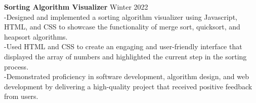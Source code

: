 \documentclass[10pt]{book}
\begin{document}
{        %
        {
            \noindent\fontsize{11}{11}
            \selectfont\hspace{-3pt}\textbf{Sorting Algorithm Visualizer \textendash}\hfill Winter 2022
        }
        \\
        \hspace{2pt}-\hspace{6pt}Designed and implemented a sorting algorithm visualizer using Javascript, HTML, and CSS to showcase the functionality of merge sort, quicksort, and 
                                heapsort algorithms.
        \\
        \hspace{2pt}-\hspace{6pt}Used HTML and CSS to create an engaging and user-friendly interface that displayed the array of numbers and highlighted the current step in the sorting process.
        \\
        \hspace{2pt}-\hspace{6pt}Demonstrated proficiency in software development, algorithm design, and web development by delivering a high-quality project that received positive 
                                feedback from users.
        \iffalse
        \\
        {
            \noindent\fontsize{11}{11}
            \selectfont\hspace{-3pt}\textbf{Text Editor \textendash}\hfill Fall 2022
        }
        \\
        \hspace{2pt}-\hspace{6pt}Collaborated with partner in developing a What You See is What You Get text editor
        \\
        \hspace{2pt}-\hspace{6pt}Used object-oriented design patterns such as the composite design pattern to better calculate positions of glyphs entered by user
        \\
        \hspace{2pt}-\hspace{6pt}Featured spell checker, image/shape insertion and undo/redo functionality
        \\
        \hspace{2pt}-\hspace{6pt}Implemented in Java using Swing and AWT frameworks
        \fi
}
\end{document}
